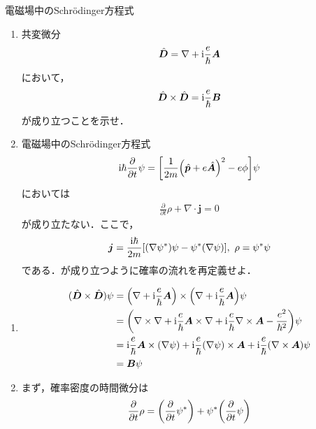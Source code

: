\documentclass{report}
\begin{document}
  \begin{myexc}{電磁場中のSchrödinger方程式}{}
  \begin{enumerate}
    \item 共変微分
      \begin{align}
        \hat{\bm{D}} = \nabla + \mathrm{i}\frac{e}{\hbar}\bm{A}
      \end{align}
      において，
      \begin{align}
        \hat{\bm{D}} \times \hat{\bm{D}} = \mathrm{i}\frac{e}{\hbar}\bm{B}
      \end{align}
      が成り立つことを示せ．
    \item 電磁場中のSchrödinger方程式
    \begin{align}
      \mathrm{i}\hbar\pdv{t}\psi = \qty[\frac{1}{2m}\qty(\hat{\bm{p}} + e\hat{\bm{A}})^2 - e\phi]\psi
    \end{align}
    においては
    \begin{align}
      \frac{\partial}{\partial t} \rho + \nabla\cdot \bm{j} = 0 \label{prob-current-exercise}
    \end{align}
    が成り立たない．ここで，
    \begin{align}
      \bm{j} = \frac{\mathrm{i}\hbar}{2m}\qty[(\nabla \psi^{*})\psi - \psi^{*} (\nabla\psi)],\ \rho = \psi^{*}\psi
    \end{align}
    である．が成り立つように確率の流れを再定義せよ．
  \end{enumerate}
  \tcblower
  \begin{enumerate}
    \item \begin{align}
      (\hat{\bm{D}} \times \hat{\bm{D}})\psi &= \qty(\nabla + \mathrm{i}\frac{e}{\hbar}\bm{A}) \times \qty(\nabla + \mathrm{i}\frac{e}{\hbar}\bm{A})\psi\\
      &= \qty(\nabla\times\nabla + \mathrm{i}\frac{e}{\hbar}\bm{A}\times\nabla + \mathrm{i}\frac{e}{\hbar}\nabla\times\bm{A} - \frac{e^2}{\hbar^2})\psi\\
      &= \mathrm{i}\frac{e}{\hbar}\bm{A}\times(\nabla\psi) + \mathrm{i}\frac{e}{\hbar}(\nabla\psi)\times\bm{A} + \mathrm{i}\frac{e}{\hbar}(\nabla\times\bm{A})\psi\\
      &= \bm{B}\psi
    \end{align}
    \item まず，確率密度の時間微分は
      \begin{align}
        \frac{\partial}{\partial t}\rho = \qty(\frac{\partial}{\partial t}\psi^{*}) + \psi^{*}\qty(\frac{\partial}{\partial t}\psi)
      \end{align}

\end{enumerate}
\end{myexc}
\end{document}
